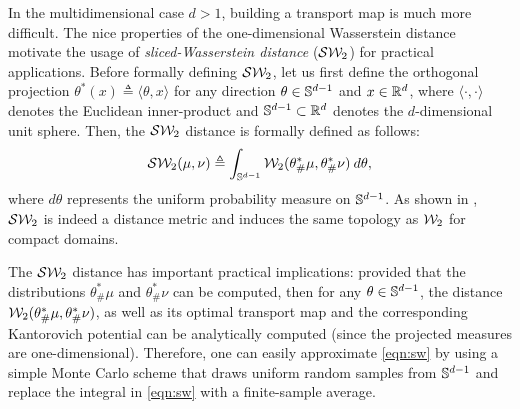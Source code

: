 In the multidimensional case $d > 1$, building a transport map is much more difficult. The nice properties of the one-dimensional Wasserstein distance motivate the usage of \emph{sliced-Wasserstein distance} (${\cal S}{\cal W}_2$) for practical applications. Before formally defining ${\cal S}{\cal W}_2$, let us first define the orthogonal projection $\theta^* (x) \triangleq \langle \theta, x \rangle$ for any direction $\theta \in \mathbb{S}^{d-1}$ and $x \in \mathbb{R}^d$, where $\langle \cdot, \cdot \rangle$ denotes the Euclidean inner-product and $\mathbb{S}^{d-1} \subset \mathbb{R}^d$ denotes the $d$-dimensional unit sphere. Then, the ${\cal S}{\cal W}_2$ distance is formally defined as follows:
\begin{align}
{\cal S}{\cal W}_2(\mu,\nu) \triangleq \int_{\mathbb{S}^{d-1}} {\cal W}_2 (\theta^*_\#\mu, \theta^*_\#\nu) \> d \theta, \label{eqn:sw}
\end{align}
where $d\theta$ represents the uniform probability measure on $\mathbb{S}^{d-1}$. As shown in \cite{bonnotte2013unidimensional}, ${\cal S}{\cal W}_2$ is indeed a distance metric and induces the same topology as ${\cal W}_2$ for compact domains.

The ${\cal S}{\cal W}_2$ distance has important practical implications: provided that the distributions $\theta^*_\#\mu$ and $\theta^*_\#\nu$ can be computed, then for any $\theta \in \mathbb{S}^{d-1}$, the distance ${\cal W}_2 (\theta^*_\#\mu, \theta^*_\#\nu)$, as well as its optimal transport map and the corresponding Kantorovich potential can be analytically computed (since the projected measures are one-dimensional). Therefore, one can easily approximate \eqref{eqn:sw} by using a simple Monte Carlo scheme that draws uniform random samples from $\mathbb{S}^{d-1}$ and replace the integral in \eqref{eqn:sw} with a finite-sample average.

